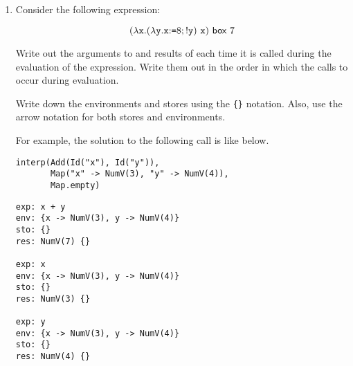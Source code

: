 \begin{enumerate}
\item Consider the following expression:

\[
  (\lambda\texttt{x}.(\lambda\texttt{y}.\texttt{x}{:}\texttt{=}8;!\texttt{y})\ \texttt{x})\ \textsf{box}\ 7
\]

Write out the arguments to and results of  each time it is called during
the evaluation of the expression. Write them out in the order in which the calls to 
occur during evaluation.

Write down the environments and stores using the \verb+{}+ notation.
Also, use the arrow notation for both stores and environments.

For example, the solution to the following  call is like below.

\begin{verbatim}
interp(Add(Id("x"), Id("y")),
       Map("x" -> NumV(3), "y" -> NumV(4)),
       Map.empty)
\end{verbatim}

\begin{verbatim}
exp: x + y
env: {x -> NumV(3), y -> NumV(4)}
sto: {}
res: NumV(7) {}

exp: x
env: {x -> NumV(3), y -> NumV(4)}
sto: {}
res: NumV(3) {}

exp: y
env: {x -> NumV(3), y -> NumV(4)}
sto: {}
res: NumV(4) {}
\end{verbatim}

\end{enumerate}
